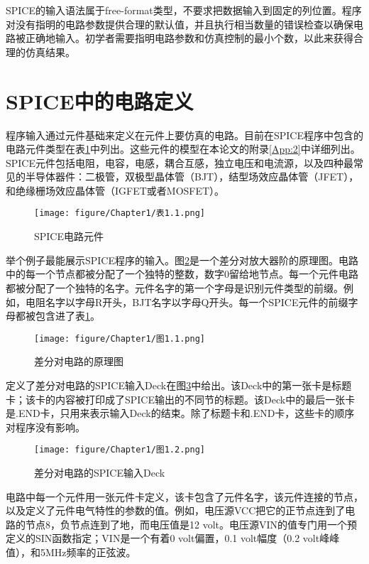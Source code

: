 SPICE的输入语法属于free-format类型，不要求把数据输入到固定的列位置。程序对没有指明的电路参数提供合理的默认值，并且执行相当数量的错误检查以确保电路被正确地输入。初学者需要指明电路参数和仿真控制的最小个数，以此来获得合理的仿真结果。

\section{SPICE中的电路定义}
程序输入通过元件基础来定义在元件上要仿真的电路。目前在SPICE程序中包含的电路元件类型在表\ref{表1.1}中列出。这些元件的模型在本论文的附录\ref{App:2}中详细列出。SPICE元件包括电阻，电容，电感，耦合互感，独立电压和电流源，以及四种最常见的半导体器件：二极管，双极型晶体管（BJT），结型场效应晶体管（JFET），和绝缘栅场效应晶体管（IGFET或者MOSFET）。
\begin{figure}[htbp]
\small
    \centering
    \texttt{[image: figure/Chapter1/表1.1.png]}
    \caption{SPICE电路元件}
    \label{表1.1}
\end{figure}

举个例子最能展示SPICE程序的输入。图\ref{图1.1}是一个差分对放大器阶的原理图。电路中的每一个节点都被分配了一个独特的整数，数字0留给地节点。每一个元件电路都被分配了一个独特的名字。元件名字的第一个字母是识别元件类型的前缀。例如，电阻名字以字母R开头，BJT名字以字母Q开头。每一个SPICE元件的前缀字母都被包含进了表\ref{表1.1}。

\begin{figure}[htbp]
\small
    \centering
    \texttt{[image: figure/Chapter1/图1.1.png]}
    \caption{差分对电路的原理图}
    \label{图1.1}
\end{figure}

定义了差分对电路的SPICE输入Deck在图\ref{图1.2}中给出。该Deck中的第一张卡是标题卡；该卡的内容被打印成了SPICE输出的不同节的标题。该Deck中的最后一张卡是.END卡，只用来表示输入Deck的结束。除了标题卡和.END卡，这些卡的顺序对程序没有影响。

\begin{figure}[htbp]
\small
    \centering
    \texttt{[image: figure/Chapter1/图1.2.png]}
    \caption{差分对电路的SPICE输入Deck}
    \label{图1.2}
\end{figure}

电路中每一个元件用一张元件卡定义，该卡包含了元件名字，该元件连接的节点，以及定义了元件电气特性的参数的值。例如，电压源VCC把它的正节点连到了电路的节点8，负节点连到了地，而电压值是12 volt。电压源VIN的值专门用一个预定义的SIN函数指定；VIN是一个有着0 volt偏置，0.1 volt幅度（0.2 volt峰峰值），和5MHz频率的正弦波。

